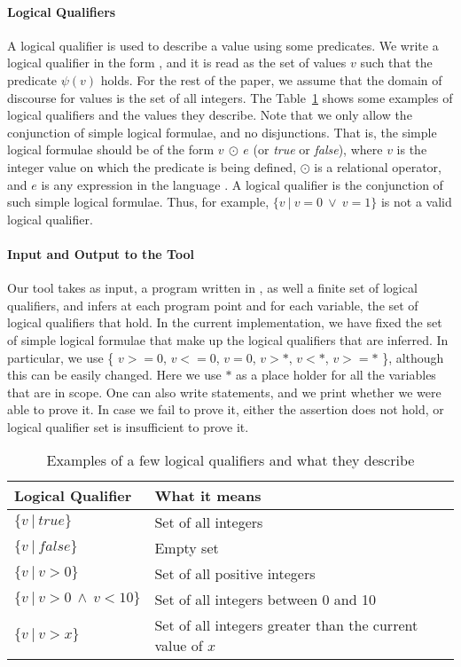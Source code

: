 \documentclass[10pt, conference, compsocconf]{IEEEtran}
\begin{document}
\paragraph{Logical Qualifiers}
A logical qualifier is used to describe a value using some predicates.
We write a logical qualifier in the form \av{}{}, and it is read as the set of values $v$ such that the predicate $\psi(v)$ holds.
For the rest of the paper, we assume that the domain of discourse for values is the set of all integers.
The Table~\ref{tab:lqs} shows some examples of logical qualifiers and the values they describe.
Note that we only allow the conjunction of simple logical formulae, and no disjunctions.
That is, the simple logical formulae should be of the form $v\ \odot\ e$ (or \textit{true} or \textit{false}), where $v$ is the integer value on which the predicate is being defined, $\odot$ is a relational operator, and $e$ is any expression in the language \lang.
A logical qualifier is the conjunction of such simple logical formulae.
Thus, for example, $\{ v\ |\ v = 0\ \lor\ v = 1\}$ is not a valid logical qualifier.

\paragraph{Input and Output to the Tool}
Our tool takes as input, a program written in \lang, as well a finite set of logical qualifiers, and infers at each program point and for each variable, the set of logical qualifiers that hold.
In the current implementation, we have fixed the set of simple logical formulae that make up the logical qualifiers that are inferred.
In particular, we use \{ $v >= 0$, $v <= 0$, $v = 0$, $v > *$, $v < *$, $v >= *$ \}, although this can be easily changed.
Here we use $*$ as a place holder for all the variables that are in scope.
One can also write  statements, and we print whether we were able to prove it.
In case we fail to prove it, either the assertion does not hold, or logical qualifier set is insufficient to prove it.

\begin{table}
\begin{center}
    \begin{tabular}{ | l | l | }
    \hline
    \textbf{Logical Qualifier} & \textbf{What it means}  \\
    \hline
    $\{ v\ |\ \textit{true}\}$ & Set of all integers \\
    \hline
    $\{ v\ |\ \textit{false}\}$ & Empty set \\
    \hline
    $\{ v\ |\ v > 0\}$ & Set of all positive integers \\
    \hline
    $\{ v\ |\ v > 0\ \land \ v < 10 \}$ & Set of all integers between 0 and 10 \\
    \hline
    $\{ v\ |\ v > x\}$ & Set of all integers greater than the current value of $x$ \\
    \hline
    \end{tabular}
\end{center}
\caption{Examples of a few logical qualifiers and what they describe}
\label{tab:lqs}
\end{table}
\end{document}
